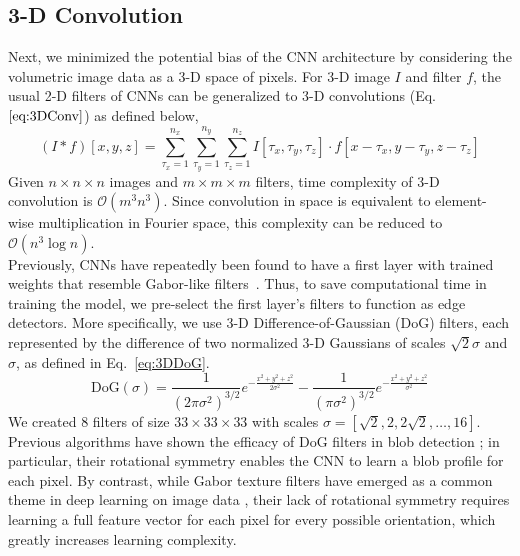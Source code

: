 \documentclass{llncs}
\begin{document}
\subsection{3-D Convolution}
Next, we minimized the potential bias of the CNN architecture by considering the volumetric image data as a 3-D space of pixels. For 3-D image $I$ and filter $f$, the usual 2-D filters of CNNs can be generalized to 3-D convolutions (Eq.~$\ref{eq:3DConv}$) as defined below,
\begin{equation}\label{eq:3DConv}
(I * f) [x,y,z] = \sum_{\tau_x = 1}^{n_x} \sum_{\tau_y = 1}^{n_y} \sum_{\tau_z = 1}^{n_z}  I[\tau_x, \tau_y, \tau_z] \cdot f[x - \tau_x, y - \tau_y, z - \tau_z]
\end{equation} %
Given $n \times n \times n$ images and $m \times m \times m$ filters, time complexity of 3-D convolution is $\mathcal{O} (m^3 n^3)$. Since convolution in space is equivalent to element-wise multiplication in Fourier space, this complexity can be reduced to $\mathcal{O} \left(n^3 \log n \right)$. \\
\indent Previously, CNNs have repeatedly been found to have a first layer with trained weights that resemble Gabor-like filters~\cite{Yosinski14}.  Thus, to save computational time in training the model, we pre-select the first layer's filters to function as edge detectors. More specifically, we use 3-D Difference-of-Gaussian (DoG) filters, each represented by the difference of two normalized 3-D Gaussians of scales $\sqrt{2} \sigma$ and $\sigma$, as defined in Eq.~\ref{eq:3DDoG}.
\begin{equation}\label{eq:3DDoG}
\text{DoG} (\sigma) = \frac{1}{(2 \pi \sigma^2)^{3/2}} e^{-\frac{x^2 + y^2 + z^2}{2 \sigma^2}} - \frac{1}{(\pi \sigma^2)^{3/2}} e^{-\frac{x^2 + y^2 + z^2}{\sigma^2}}
\end{equation}
We created 8 filters of size $33 \times 33 \times 33$ with scales $\sigma = [\sqrt{2}, 2, 2 \sqrt{2}, \dots, 16]$.  Previous algorithms have shown the efficacy of DoG filters in blob detection \cite{sift}; in particular, their rotational symmetry enables the CNN to learn a blob profile for each pixel.  By contrast, while Gabor texture filters have emerged as a common theme in deep learning on image data \cite{Krizhevsky12}, their lack of rotational symmetry requires learning a full feature vector for each pixel for every possible orientation, which greatly increases learning complexity. \\
\end{document}
